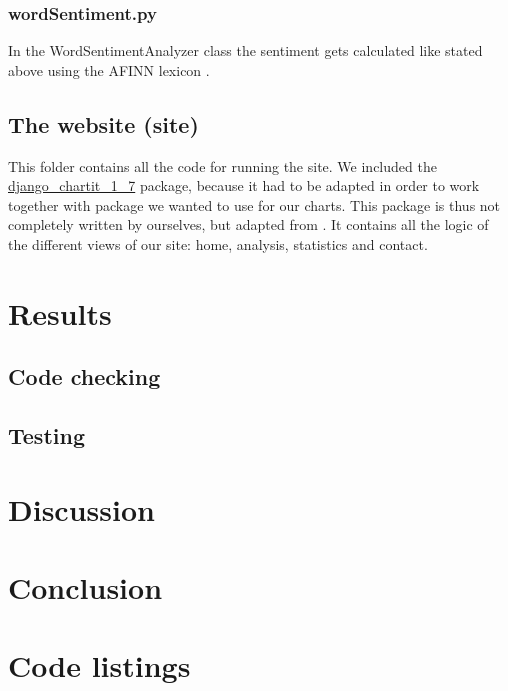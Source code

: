 \documentclass[10pt]{IEEEtran}
\begin{document}
\subsubsection{wordSentiment.py}

In the WordSentimentAnalyzer class the sentiment gets calculated like stated above using the AFINN lexicon \cite{AFINN}. 

\subsection{The website (site)}

This folder contains all the code for running the site. We included the \url{django_chartit_1_7} package, because it had to be adapted in order to work together with package we wanted to use for our charts. This package is thus not completely written by ourselves, but adapted from \cite{django}. It contains all the logic of the different views of our site: home, analysis, statistics and contact. 

\section{Results}


\subsection{Code checking}


\subsection{Testing}


\section{Discussion}


\section{Conclusion}






\clearpage
\onecolumn
\appendices
\section{Code listings}

\lstlistoflistings
\end{document}
